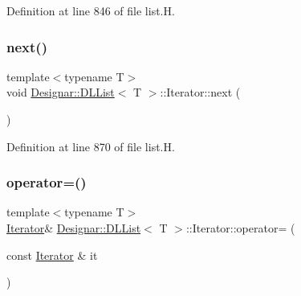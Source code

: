 Definition at line 846 of file list.\+H.

\mbox{\label{class_designar_1_1_d_l_list_1_1_iterator_ac4eb0645c0e4e68057bf0bc05cf3c8c3}} 
\subsubsection{\texorpdfstring{next()}{next()}}
{\footnotesize\ttfamily template$<$typename T$>$ \\
void \hyperlink{class_designar_1_1_d_l_list}{Designar\+::\+D\+L\+List}$<$ T $>$\+::Iterator\+::next (\begin{DoxyParamCaption}{ }\end{DoxyParamCaption})\hspace{0.3cm}{\ttfamily [inline]}}



Definition at line 870 of file list.\+H.

\mbox{\label{class_designar_1_1_d_l_list_1_1_iterator_a292588690dcaa7acc2311a92e535424e}} 
\subsubsection{\texorpdfstring{operator=()}{operator=()}\hspace{0.1cm}{\footnotesize\ttfamily [1/2]}}
{\footnotesize\ttfamily template$<$typename T$>$ \\
\hyperlink{class_designar_1_1_d_l_list_1_1_iterator}{Iterator}\& \hyperlink{class_designar_1_1_d_l_list}{Designar\+::\+D\+L\+List}$<$ T $>$\+::Iterator\+::operator= (\begin{DoxyParamCaption}\item[{const \hyperlink{class_designar_1_1_d_l_list_1_1_iterator}{Iterator} \&}]{it }\end{DoxyParamCaption})\hspace{0.3cm}{\ttfamily [inline]}}



